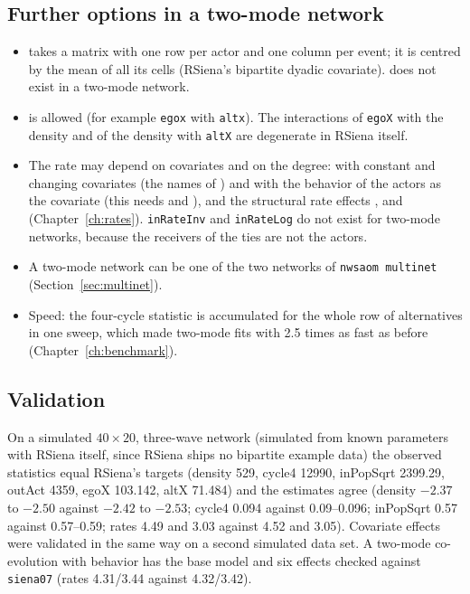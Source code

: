 \subsection{Further options in a two-mode network}
\begin{itemize}
\item {} takes a matrix with one row per actor and one column per event; it is centred by the mean of all its cells (RSiena's bipartite dyadic covariate).  does not exist in a two-mode network.
\item {} is allowed (for example \texttt{egox} with \texttt{altx}). The interactions of \texttt{egoX} with the density and of the density with \texttt{altX} are degenerate in RSiena itself.
\item The rate may depend on covariates and on the degree:  with constant and changing covariates (the names of ) and with the behavior of the actors as the covariate (this needs  and ), and the structural rate effects ,  and  (Chapter~\ref{ch:rates}). \texttt{inRateInv} and \texttt{inRateLog} do not exist for two-mode networks, because the receivers of the ties are not the actors.
\item A two-mode network can be one of the two networks of \texttt{nwsaom multinet} (Section~\ref{sec:multinet}).
\item Speed: the four-cycle statistic is accumulated for the whole row of alternatives in one sweep, which made two-mode fits with  2.5 times as fast as before (Chapter~\ref{ch:benchmark}).
\end{itemize}

\subsection{Validation}

On a simulated $40\times20$, three-wave network (simulated from known parameters with RSiena itself, since RSiena ships no bipartite example data) the observed statistics equal RSiena's targets (density 529, cycle4 12990, inPopSqrt 2399.29, outAct 4359, egoX 103.142, altX 71.484) and the estimates agree (density $-2.37$ to $-2.50$ against $-2.42$ to $-2.53$; cycle4 0.094 against 0.09--0.096; inPopSqrt 0.57 against 0.57--0.59; rates 4.49 and 3.03 against 4.52 and 3.05). Covariate effects were validated in the same way on a second simulated data set. A two-mode co-evolution with behavior has the base model and six effects checked against \texttt{siena07} (rates 4.31/3.44 against 4.32/3.42).

